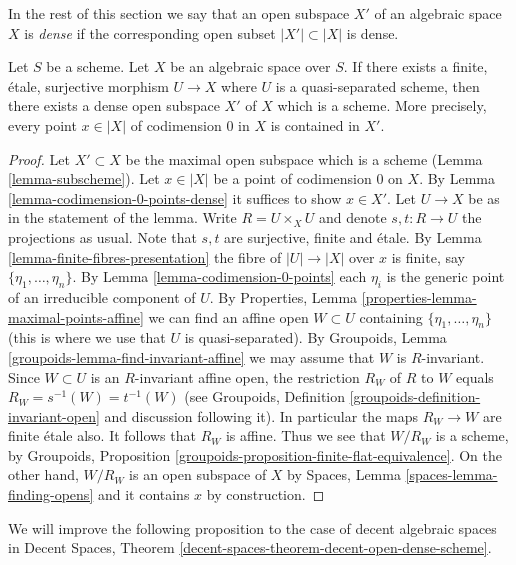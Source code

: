 \noindent
In the rest of this section we say that an open subspace
$X'$ of an algebraic space $X$ is {\it dense} if the corresponding
open subset $|X'| \subset |X|$ is dense.

\begin{lemma}
\label{lemma-quasi-separated-finite-etale-cover-dense-open-scheme}
Let $S$ be a scheme. Let $X$ be an algebraic space over $S$.
If there exists a finite, \'etale, surjective morphism
$U \to X$ where $U$ is a quasi-separated scheme, then
there exists a dense open subspace $X'$ of $X$ which is a scheme.
More precisely, every point $x \in |X|$ of codimension $0$ in $X$
is contained in $X'$.
\end{lemma}

\begin{proof}
Let $X' \subset X$ be the maximal open subspace which is a scheme
(Lemma \ref{lemma-subscheme}).
Let $x \in |X|$ be a point of codimension $0$ on $X$.
By Lemma \ref{lemma-codimension-0-points-dense}
it suffices to show $x \in X'$.
Let $U \to X$ be as in the statement of the lemma.
Write $R = U \times_X U$ and denote $s, t : R \to U$ the projections as usual.
Note that $s, t$ are surjective, finite and \'etale.
By Lemma \ref{lemma-finite-fibres-presentation}
the fibre of $|U| \to |X|$ over $x$ is finite, say
$\{\eta_1, \ldots, \eta_n\}$. By Lemma \ref{lemma-codimension-0-points}
each $\eta_i$ is the generic point of an irreducible component of $U$.
By Properties, Lemma \ref{properties-lemma-maximal-points-affine}
we can find an affine open $W \subset U$ containing
$\{\eta_1, \ldots, \eta_n\}$
(this is where we use that $U$ is quasi-separated). By
Groupoids, Lemma \ref{groupoids-lemma-find-invariant-affine}
we may assume that $W$ is $R$-invariant.
Since $W \subset U$ is an $R$-invariant affine open, the restriction
$R_W$ of $R$ to $W$ equals $R_W = s^{-1}(W) = t^{-1}(W)$ (see
Groupoids, Definition \ref{groupoids-definition-invariant-open}
and discussion following it). In particular the maps $R_W \to W$ are
finite \'etale also. It follows that $R_W$ is affine.
Thus we see that $W/R_W$ is a scheme, by
Groupoids, Proposition \ref{groupoids-proposition-finite-flat-equivalence}.
On the other hand, $W/R_W$ is an open subspace of $X$ by
Spaces, Lemma \ref{spaces-lemma-finding-opens} and it contains
$x$ by construction.
\end{proof}

\noindent
We will improve the following proposition to the case of
decent algebraic spaces in
Decent Spaces, Theorem
\ref{decent-spaces-theorem-decent-open-dense-scheme}.

